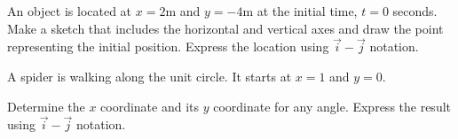 \begin{problem}
\item An object is located at $x=2$m and $y=-4$m at the initial time,
  $t=0$ seconds. Make a sketch that includes the horizontal and vertical
  axes and draw the point representing the initial position.
  Express the location using $\vec{i}-\vec{j}$ notation.
  \vfill
\item A spider is walking along the unit circle. It starts at $x=1$
  and $y=0$.

  \scalebox{0.35}{}

  Determine the $x$ coordinate and its $y$ coordinate for any
  angle. Express the result using $\vec{i}-\vec{j}$ notation.

  \vfill
\end{problem}



